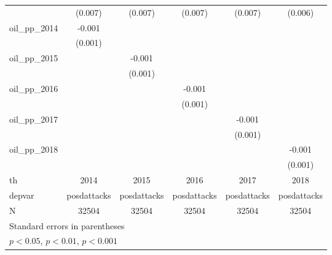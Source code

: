 {\begin{tabular}{l*{5}{c}}
            &     (0.007)         &     (0.007)         &     (0.007)         &     (0.007)         &     (0.006)         \\
[1em]
oil\_pp\_2014 &      -0.001         &                     &                     &                     &                     \\
            &     (0.001)         &                     &                     &                     &                     \\
[1em]
oil\_pp\_2015 &                     &      -0.001         &                     &                     &                     \\
            &                     &     (0.001)         &                     &                     &                     \\
[1em]
oil\_pp\_2016 &                     &                     &      -0.001         &                     &                     \\
            &                     &                     &     (0.001)         &                     &                     \\
[1em]
oil\_pp\_2017 &                     &                     &                     &      -0.001         &                     \\
            &                     &                     &                     &     (0.001)         &                     \\
[1em]
oil\_pp\_2018 &                     &                     &                     &                     &      -0.001         \\
            &                     &                     &                     &                     &     (0.001)         \\
\hline
th          &        2014         &        2015         &        2016         &        2017         &        2018         \\
depvar      & posdattacks         & posdattacks         & posdattacks         & posdattacks         & posdattacks         \\
N           &       32504         &       32504         &       32504         &       32504         &       32504         \\
\hline\hline
\multicolumn{6}{l}{\footnotesize Standard errors in parentheses}\\
\multicolumn{6}{l}{\footnotesize \sym{*} \(p<0.05\), \sym{**} \(p<0.01\), \sym{***} \(p<0.001\)}\\
\end{tabular}
}

